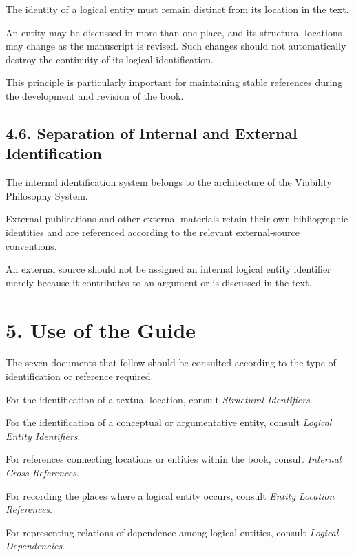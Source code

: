 The identity of a logical entity must
remain distinct from its location in
the text.

An entity may be discussed in more
than one place, and its structural
locations may change as the manuscript
is revised. Such changes should not
automatically destroy the continuity
of its logical identification.

This principle is particularly important
for maintaining stable references during
the development and revision of the book.

\subsection*{4.6. Separation of Internal and External
Identification}

The internal identification system
belongs to the architecture of the
Viability Philosophy System.

External publications and other
external materials retain their own
bibliographic identities and are
referenced according to the relevant
external-source conventions.

An external source should not be
assigned an internal logical entity
identifier merely because it contributes
to an argument or is discussed in the text.


\section*{5. Use of the Guide}

The seven documents that follow should
be consulted according to the type of
identification or reference required.

For the identification of a textual
location, consult \textit{Structural
Identifiers}.

For the identification of a conceptual
or argumentative entity, consult
\textit{Logical Entity Identifiers}.

For references connecting locations
or entities within the book, consult
\textit{Internal Cross-References}.

For recording the places where a
logical entity occurs, consult
\textit{Entity Location References}.

For representing relations of
dependence among logical entities,
consult \textit{Logical Dependencies}.

